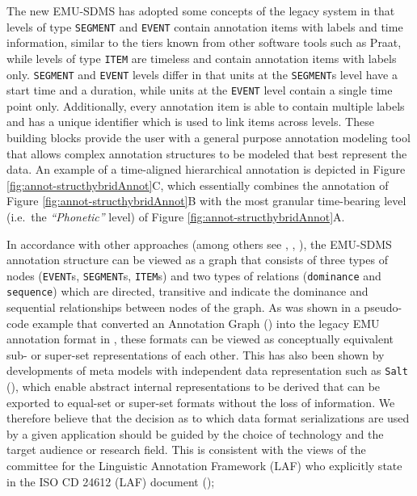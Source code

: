 \documentclass[]{book}
\theoremstyle{definition}
\theoremstyle{definition}
\theoremstyle{definition}
\theoremstyle{remark}
\begin{document}
The new EMU-SDMS has adopted some concepts of the legacy system in that
levels of type \texttt{SEGMENT} and \texttt{EVENT} contain annotation
items with labels and time information, similar to the tiers known from
other software tools such as Praat, while levels of type \texttt{ITEM}
are timeless and contain annotation items with labels only.
\texttt{SEGMENT} and \texttt{EVENT} levels differ in that units at the
\texttt{SEGMENT}s level have a start time and a duration, while units at
the \texttt{EVENT} level contain a single time point only. Additionally,
every annotation item is able to contain multiple labels and has a
unique identifier which is used to link items across levels. These
building blocks provide the user with a general purpose annotation
modeling tool that allows complex annotation structures to be modeled
that best represent the data. An example of a time-aligned hierarchical
annotation is depicted in Figure \ref{fig:annot-structhybridAnnot}C,
which essentially combines the annotation of Figure
\ref{fig:annot-structhybridAnnot}B with the most granular time-bearing
level (i.e.~the \emph{``Phonetic''} level) of Figure
\ref{fig:annot-structhybridAnnot}A.

In accordance with other approaches (among others see
\citet{bird:sc2001a}, \citet{zipser:2010a}, \citet{ide:nle2004a}), the
EMU-SDMS annotation structure can be viewed as a graph that consists of
three types of nodes (\texttt{EVENT}s, \texttt{SEGMENT}s,
\texttt{ITEM}s) and two types of relations (\texttt{dominance} and
\texttt{sequence}) which are directed, transitive and indicate the
dominance and sequential relationships between nodes of the graph. As
was shown in a pseudo-code example that converted an Annotation Graph
(\citet{bird:sc2001a}) into the legacy EMU annotation format in
\citet{cassidy:sc2001a}, these formats can be viewed as conceptually
equivalent sub- or super-set representations of each other. This has
also been shown by developments of meta models with independent data
representation such as \texttt{Salt} (\citet{zipser:2010a}), which
enable abstract internal representations to be derived that can be
exported to equal-set or super-set formats without the loss of
information. We therefore believe that the decision as to which data
format serializations are used by a given application should be guided
by the choice of technology and the target audience or research field.
This is consistent with the views of the committee for the Linguistic
Annotation Framework (LAF) who explicitly state in the ISO CD 24612
(LAF) document (\citet{ISOLAF});
\end{document}
